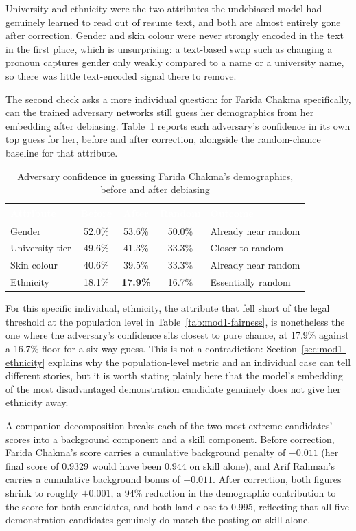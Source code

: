 \documentclass[11pt,a4paper]{article}
\newcommand{\hdrow}{\rowcolor{TPnavy}}
\newcommand{\hdtxt}[1]{\textcolor{white}{\bfseries #1}}
\begin{document}
University and ethnicity were the two attributes the undebiased model had genuinely learned to read out of resume text, and both are almost entirely gone after correction. Gender and skin colour were never strongly encoded in the text in the first place, which is unsurprising: a text-based swap such as changing a pronoun captures gender only weakly compared to a name or a university name, so there was little text-encoded signal there to remove.

The second check asks a more individual question: for Farida Chakma specifically, can the trained adversary networks still guess her demographics from her embedding after debiasing. Table~\ref{tab:mod1-adversary-individual} reports each adversary's confidence in its own top guess for her, before and after correction, alongside the random-chance baseline for that attribute.

\begin{table}[H]
\centering
\caption{Adversary confidence in guessing Farida Chakma's demographics, before and after debiasing}
\label{tab:mod1-adversary-individual}
\small
\begin{tabular}{lcccl}
\toprule
\hdrow \hdtxt{Attribute} & \hdtxt{Before} & \hdtxt{After} & \hdtxt{Random} & \hdtxt{Outcome} \\
\midrule
Gender & 52.0\% & 53.6\% & 50.0\% & Already near random \\
\rowcolor{TPlight}
University tier & 49.6\% & 41.3\% & 33.3\% & Closer to random \\
Skin colour & 40.6\% & 39.5\% & 33.3\% & Already near random \\
\rowcolor{TPlight}
Ethnicity & 18.1\% & \textbf{17.9\%} & 16.7\% & Essentially random \\
\bottomrule
\end{tabular}
\end{table}

For this specific individual, ethnicity, the attribute that fell short of the legal threshold at the population level in Table~\ref{tab:mod1-fairness}, is nonetheless the one where the adversary's confidence sits closest to pure chance, at 17.9\% against a 16.7\% floor for a six-way guess. This is not a contradiction: Section~\ref{sec:mod1-ethnicity} explains why the population-level metric and an individual case can tell different stories, but it is worth stating plainly here that the model's embedding of the most disadvantaged demonstration candidate genuinely does not give her ethnicity away.

A companion decomposition breaks each of the two most extreme candidates' scores into a background component and a skill component. Before correction, Farida Chakma's score carries a cumulative background penalty of $-0.011$ (her final score of 0.9329 would have been 0.944 on skill alone), and Arif Rahman's carries a cumulative background bonus of $+0.011$. After correction, both figures shrink to roughly $\pm0.001$, a 94\% reduction in the demographic contribution to the score for both candidates, and both land close to 0.995, reflecting that all five demonstration candidates genuinely do match the posting on skill alone.
\end{document}

